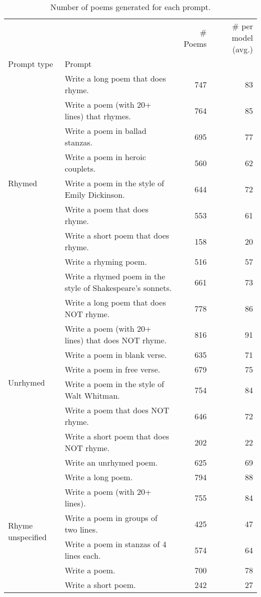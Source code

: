 \begin{table}[H]
  \centering
  \small
  \singlespacing
  \begin{tabular}{llrr}
  \toprule
   &  & \# Poems & \# per model (avg.) \\
  Prompt type & Prompt &  &  \\
  \midrule
  \multirow[t]{9}{*}{Rhymed} & Write a long poem that does rhyme. & 747 & 83 \\
   & Write a poem (with 20+ lines) that rhymes. & 764 & 85 \\
   & Write a poem in ballad stanzas. & 695 & 77 \\
   & Write a poem in heroic couplets. & 560 & 62 \\
   & Write a poem in the style of Emily Dickinson. & 644 & 72 \\
   & Write a poem that does rhyme. & 553 & 61 \\
   & Write a short poem that does rhyme. & 158 & 20 \\
   & Write a rhyming poem. & 516 & 57 \\
   & Write a rhymed poem in the style of Shakespeare's sonnets. & 661 & 73 \\
  \cline{1-4}
  \multirow[t]{8}{*}{Unrhymed} & Write a long poem that does NOT rhyme. & 778 & 86 \\
   & Write a poem (with 20+ lines) that does NOT rhyme. & 816 & 91 \\
   & Write a poem in blank verse. & 635 & 71 \\
   & Write a poem in free verse. & 679 & 75 \\
   & Write a poem in the style of Walt Whitman. & 754 & 84 \\
   & Write a poem that does NOT rhyme. & 646 & 72 \\
   & Write a short poem that does NOT rhyme. & 202 & 22 \\
   & Write an unrhymed poem. & 625 & 69 \\
  \cline{1-4}
  \multirow[t]{6}{*}{Rhyme unspecified} & Write a long poem. & 794 & 88 \\
   & Write a poem (with 20+ lines). & 755 & 84 \\
   & Write a poem in groups of two lines. & 425 & 47 \\
   & Write a poem in stanzas of 4 lines each. & 574 & 64 \\
   & Write a poem. & 700 & 78 \\
   & Write a short poem. & 242 & 27 \\
  \bottomrule
  \end{tabular}
  \caption{Number of poems generated for each prompt.}
  \label{tab:num_poems_rhyme_promptings}
\end{table}